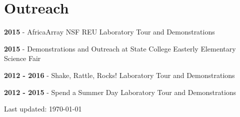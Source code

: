 \documentclass[letterpaper]{article}
\def\footerlink{}
\renewenvironment{itemize}{
  \begin{list}{}{
    \setlength{\leftmargin}{1.5em}
  }
}{
  \end{list}
}
\begin{document}
\section*{Outreach}
\begin{itemize}
\item \textbf{2015} - AfricaArray NSF REU Laboratory Tour and Demonstrations
\item\textbf{2015} - Demonstrations and Outreach at State College Easterly Elementary Science Fair
\item \textbf{2012 - 2016} - Shake, Rattle, Rocks! Laboratory Tour and Demonstrations
\item \textbf{2012 - 2015} - Spend a Summer Day Laboratory Tour and Demonstrations
\end{itemize}






\begin{center}
  \begin{footnotesize}
    Last updated: \today \\
    \href{\footerlink}{\texttt{\footerlink}}
  \end{footnotesize}
\end{center}
\end{document}
